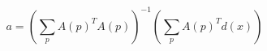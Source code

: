 \begin{equation}
    \label{eq:optimal-parameter-affine}
    a = \left (\sum_p A(p)^T A(p) \right )^{-1} \left (\sum_p A(p)^T d(x) \right)
\end{equation}
